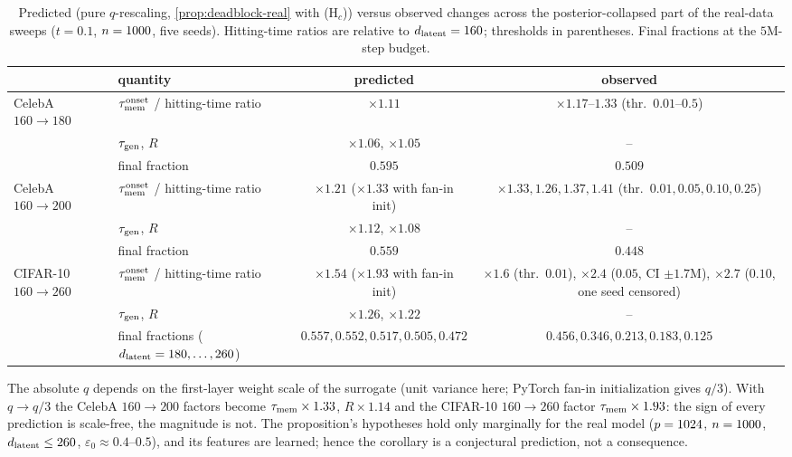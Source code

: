 \begin{table}[h]
\centering\small
\caption{Predicted (pure $q$-rescaling, \cref{prop:deadblock-real} with (H$_c$)) versus observed changes across the posterior-collapsed part of the real-data sweeps ($t=0.1$, $n=1000$, five seeds). Hitting-time ratios are relative to $d_{\mathrm{latent}}=160$; thresholds in parentheses. Final fractions at the $5$M-step budget.}
\label{tab:flatdeff-real}
\begin{tabular}{llcc}
\toprule
 & quantity & predicted & observed\\
\midrule
CelebA $160\to180$ & $\tau_{\mathrm{mem}}^{\rm onset}$ / hitting-time ratio & $\times1.11$ & $\times1.17$--$1.33$ (thr.\ $0.01$--$0.5$)\\
 & $\tau_{\mathrm{gen}}$, $R$ & $\times1.06$, $\times1.05$ & --\\
 & final fraction & $0.595$ & $0.509$\\
CelebA $160\to200$ & $\tau_{\mathrm{mem}}^{\rm onset}$ / hitting-time ratio & $\times1.21$ ($\times1.33$ with fan-in init) & $\times1.33,1.26,1.37,1.41$ (thr.\ $0.01,0.05,0.10,0.25$)\\
 & $\tau_{\mathrm{gen}}$, $R$ & $\times1.12$, $\times1.08$ & --\\
 & final fraction & $0.559$ & $0.448$\\
CIFAR-10 $160\to260$ & $\tau_{\mathrm{mem}}^{\rm onset}$ / hitting-time ratio & $\times1.54$ ($\times1.93$ with fan-in init) & $\times1.6$ (thr.\ $0.01$), $\times2.4$ ($0.05$, CI $\pm1.7$M), $\times2.7$ ($0.10$, one seed censored)\\
 & $\tau_{\mathrm{gen}}$, $R$ & $\times1.26$, $\times1.22$ & --\\
 & final fractions ($d_{\mathrm{latent}}=180,\dots,260$) & $0.557,0.552,0.517,0.505,0.472$ & $0.456,0.346,0.213,0.183,0.125$\\
\bottomrule
\end{tabular}
\end{table}
The absolute $q$ depends on the first-layer weight scale of the surrogate (unit variance here; PyTorch fan-in initialization gives $q/3$). With $q\to q/3$ the CelebA $160\to200$ factors become $\tau_{\mathrm{mem}}\times1.33$, $R\times1.14$ and the CIFAR-10 $160\to260$ factor $\tau_{\mathrm{mem}}\times1.93$: the sign of every prediction is scale-free, the magnitude is not. The proposition's hypotheses hold only marginally for the real model ($p=1024$, $n=1000$, $d_{\mathrm{latent}}\le260$, $\varepsilon_0\approx0.4$--$0.5$), and its features are learned; hence the corollary is a conjectural prediction, not a consequence.

